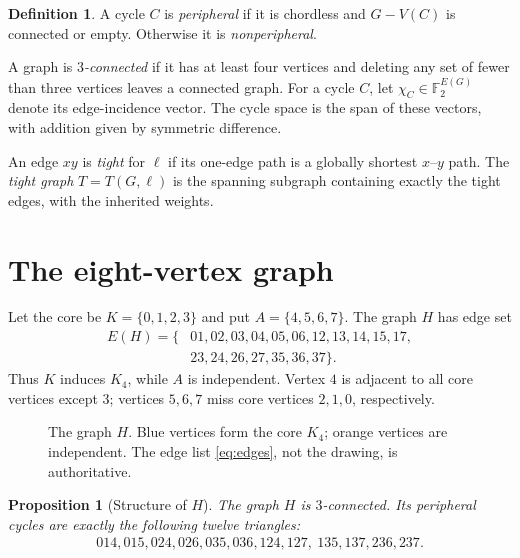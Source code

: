 \documentclass[11pt]{amsart}
\newtheorem{proposition}[theorem]{Proposition}
\theoremstyle{definition}
\newtheorem{definition}[theorem]{Definition}
\newcommand{\Ftwo}{\mathbb{F}_2}
\begin{document}
\begin{definition}\label{def:peripheral}
A cycle $C$ is \emph{peripheral} if it is chordless and $G-V(C)$ is connected or empty.  Otherwise it is \emph{nonperipheral}.
\end{definition}

A graph is \emph{$3$-connected} if it has at least four vertices and deleting any set of fewer than three vertices leaves a connected graph.  For a cycle $C$, let $\chi_C\in\Ftwo^{E(G)}$ denote its edge-incidence vector.  The cycle space is the span of these vectors, with addition given by symmetric difference.

An edge $xy$ is \emph{tight} for $\ell$ if its one-edge path is a globally shortest $x$--$y$ path.  The \emph{tight graph} $T=T(G,\ell)$ is the spanning subgraph containing exactly the tight edges, with the inherited weights.

\section{The eight-vertex graph}\label{sec:graph}

Let the core be $K=\{0,1,2,3\}$ and put $A=\{4,5,6,7\}$.  The graph $H$ has edge set
\begin{equation}\label{eq:edges}
\begin{split}
E(H)=\{&01,02,03,04,05,06,12,13,14,15,17,\\
       &23,24,26,27,35,36,37\}.
\end{split}
\end{equation}
Thus $K$ induces $K_4$, while $A$ is independent.  Vertex $4$ is adjacent to all core vertices except $3$; vertices $5,6,7$ miss core vertices $2,1,0$, respectively.

\begin{figure}[ht]
\centering

\caption{The graph $H$.  Blue vertices form the core $K_4$; orange vertices are independent.  The edge list \eqref{eq:edges}, not the drawing, is authoritative.}\label{fig:H}
\end{figure}

\begin{proposition}[Structure of $H$]\label{prop:structure}
The graph $H$ is $3$-connected.  Its peripheral cycles are exactly the following twelve triangles:
\begin{equation}\label{eq:peripheral}
\begin{gathered}
014,015,024,026,035,036,124,127,\
135,137,236,237.
\end{gathered}
\end{equation}
\end{proposition}
\end{document}
